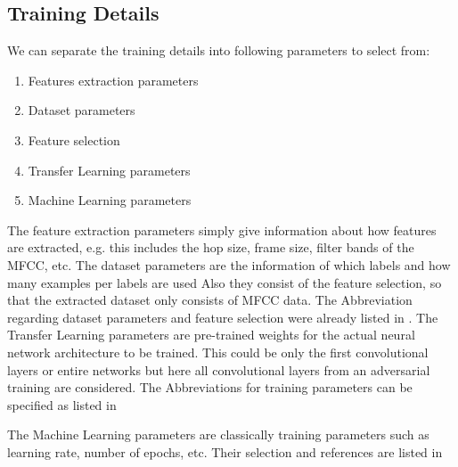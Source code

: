 
\subsection{Training Details}
We can separate the training details into following parameters to select from:
\begin{enumerate}
  \item Features extraction parameters
  \item Dataset parameters
  \item Feature selection
  \item Transfer Learning parameters
  \item Machine Learning parameters
\end{enumerate}
The feature extraction parameters simply give information about how features are extracted, e.g. this includes the hop size, frame size, filter bands of the MFCC, etc.
The dataset parameters are the information of which labels and how many examples per labels are used
Also they consist of the feature selection, so that the extracted dataset only consists of MFCC data. 
The Abbreviation regarding dataset parameters and feature selection were already listed in .
The Transfer Learning parameters are pre-trained weights for the actual neural network architecture to be trained.
This could be only the first convolutional layers or entire networks but here all convolutional layers from an adversarial training are considered. 
The Abbreviations for training parameters can be specified as listed in 


The Machine Learning parameters are classically training parameters such as learning rate, number of epochs, etc.
Their selection and references are listed in 



